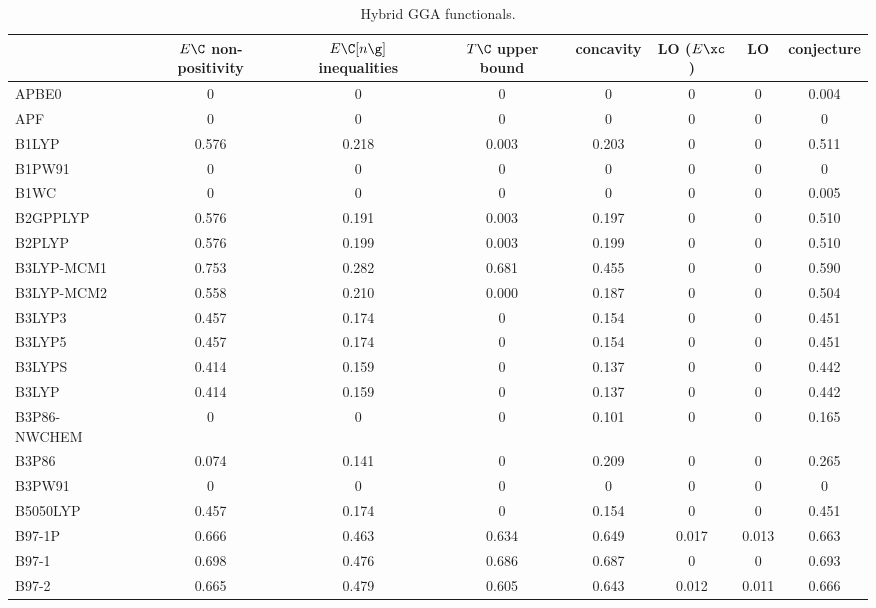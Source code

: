 \begin{table}
\caption{Hybrid GGA functionals.}
\begin{tabular}{|l|c|c|c|c|c|c|c|}
\toprule
 & $E\C$ non-positivity & $E\C[n\g]$ inequalities & $T\C$ upper bound & concavity & LO ($E\xc$) & LO & conjecture \\
\midrule
APBE0~\cite{Fabiano2015_122} & 0 & 0 & 0 & 0 & 0 & 0 & 0.004 \\
APF~\cite{Austin2012_4989} & 0 & 0 & 0 & 0 & 0 & 0 & 0 \\
B1LYP~\cite{Adamo1997_242} & 0.576 & 0.218 & 0.003 & 0.203 & 0 & 0 & 0.511 \\
B1PW91~\cite{Adamo1997_242} & 0 & 0 & 0 & 0 & 0 & 0 & 0 \\
B1WC~\cite{Bilc2008_165107} & 0 & 0 & 0 & 0 & 0 & 0 & 0.005 \\
B2GPPLYP~\cite{Karton2008_12868} & 0.576 & 0.191 & 0.003 & 0.197 & 0 & 0 & 0.510 \\
B2PLYP~\cite{Grimme2006_034108} & 0.576 & 0.199 & 0.003 & 0.199 & 0 & 0 & 0.510 \\
B3LYP-MCM1~\cite{Caldeira2019_62} & 0.753 & 0.282 & 0.681 & 0.455 & 0 & 0 & 0.590 \\
B3LYP-MCM2~\cite{Caldeira2019_62} & 0.558 & 0.210 & 0.000 & 0.187 & 0 & 0 & 0.504 \\
B3LYP3~\cite{Stephens1994_11623} & 0.457 & 0.174 & 0 & 0.154 & 0 & 0 & 0.451 \\
B3LYP5~\cite{Stephens1994_11623} & 0.457 & 0.174 & 0 & 0.154 & 0 & 0 & 0.451 \\
B3LYPS~\cite{Reiher2001_48} & 0.414 & 0.159 & 0 & 0.137 & 0 & 0 & 0.442 \\
B3LYP~\cite{Stephens1994_11623} & 0.414 & 0.159 & 0 & 0.137 & 0 & 0 & 0.442 \\
B3P86-NWCHEM~\cite{nwchemimplementation} & 0 & 0 & 0 & 0.101 & 0 & 0 & 0.165 \\
B3P86~\cite{gaussianimplementation} & 0.074 & 0.141 & 0 & 0.209 & 0 & 0 & 0.265 \\
B3PW91~\cite{Becke1993_5648} & 0 & 0 & 0 & 0 & 0 & 0 & 0 \\
B5050LYP~\cite{Shao2003_4807} & 0.457 & 0.174 & 0 & 0.154 & 0 & 0 & 0.451 \\
B97-1P~\cite{Cohen2000_160} & 0.666 & 0.463 & 0.634 & 0.649 & 0.017 & 0.013 & 0.663 \\
B97-1~\cite{Hamprecht1998_6264} & 0.698 & 0.476 & 0.686 & 0.687 & 0 & 0 & 0.693 \\
B97-2~\cite{Wilson2001_9233} & 0.665 & 0.479 & 0.605 & 0.643 & 0.012 & 0.011 & 0.666 \\

\end{tabular}
\end{table}
